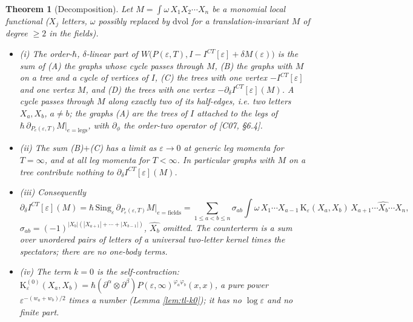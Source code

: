 \documentclass[11pt]{article}
\numberwithin{equation}{section}
\theoremstyle{plain}
\newtheorem{theorem}{Theorem}[section]
\theoremstyle{definition}
\begin{document}
\begin{theorem}[Decomposition]
\label{thm:tl-decomp}
Let $M=\int\omega\,X_1X_2\cdots X_n$ be a monomial local functional ($X_j$ letters, $\omega$ possibly replaced by $\mathrm{dvol}$ for a translation-invariant $M$ of degree $\ge2$ in the fields).
\begin{itemize}
\item (i) The order-$\hbar$, $\delta$-linear part of $W\big(P(\varepsilon,T),I-I^{CT}[\varepsilon]+\delta M(\varepsilon)\big)$ is the sum of (A) the graphs whose cycle passes through $M$, (B) the graphs with $M$ on a tree and a cycle of vertices of $I$, (C) the trees with one vertex $-I^{CT}[\varepsilon]$ and one vertex $M$, and (D) the trees with one vertex $-\partial_\delta I^{CT}[\varepsilon](M)$. A cycle passes through $M$ along exactly two of its half-edges, i.e. two letters $X_a,X_b$, $a\ne b$; the graphs (A) are the trees of $I$ attached to the legs of $\hbar\,\partial_{P_e(\varepsilon,T)}M\big|_{e=\text{legs}}$, with $\partial_\phi$ the order-two operator of [C07, §6.4].
\item (ii) The sum (B)$+$(C) has a limit as $\varepsilon\to0$ at generic leg momenta for $T=\infty$, and at all leg momenta for $T<\infty$. In particular graphs with $M$ on a tree contribute nothing to $\partial_\delta I^{CT}[\varepsilon](M)$.
\item (iii) Consequently
\begin{equation}
\partial_\delta I^{CT}[\varepsilon](M)=\hbar\,\mathrm{Sing}_\varepsilon\,\partial_{P_e(\varepsilon,T)}M\Big|_{e=\text{fields}}
=\sum_{1\le a<b\le n}\sigma_{ab}\int\omega\,X_1\cdots X_{a-1}\,\mathrm K_\varepsilon(X_a,X_b)\,X_{a+1}\cdots\widehat{X_b}\cdots X_n ,
\label{eq:tl-decomp}
\end{equation}
$\sigma_{ab}=(-1)^{|X_b|(|X_{a+1}|+\cdots+|X_{b-1}|)}$, $\widehat{X_b}$ omitted. The counterterm is a sum over unordered pairs of letters of a universal two-letter kernel times the spectators; there are no one-body terms.
\item (iv) The term $k=0$ is the self-contraction: $\mathrm K^{(0)}_\varepsilon(X_a,X_b)=\hbar(\partial^\alpha\otimes\partial^\beta)P(\varepsilon,\infty)^{\varphi_a\varphi_b}(x,x)$, a pure power $\varepsilon^{-(w_a+w_b)/2}$ times a number (Lemma \ref{lem:tl-k0}); it has no $\log\varepsilon$ and no finite part.
\end{itemize}
\end{theorem}
\end{document}
